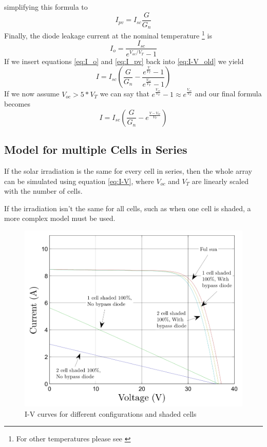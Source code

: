 simplifying this formula to
\begin{equation} \label{eq:I_pv}
    I_{pv} = I_{sc} \frac{G}{G_n}
\end{equation}
Finally, the  diode  leakage  current  at  the nominal temperature \footnote{For
other temperatures please see \cite{ref:villa:pvmodel}} is
\begin{equation} \label{eq:I_o}
    I_o = \frac{I_{sc}}{e^{V_{oc} / V_T} - 1}
\end{equation}
If  we   insert   equations   \eqref{eq:I_o}   and   \eqref{eq:I_pv}  back  into
\eqref{eq:I-V_old} we yield
\begin{equation}
    I = I_{sc} \left( \frac{G}{G_n} - \frac{e^{\frac{V}{V_T}}-1}{e^{\frac{V_{oc}}{V_T}}-1} \right)
\end{equation}
If we now assume $V_{oc} > 5 * V_T$ we can  say  that  $e^{\frac{V_{oc}}{V_T}}-1
\approx e^{\frac{V_{oc}}{V_T}}$ and our final formula becomes
\begin{equation} \label{eq:I-V}
    I = I_{sc} \left( \frac{G}{G_n} - e^{\frac{V - V_{oc}}{V_T}} \right)
\end{equation}


\subsection{Model for multiple Cells in Series}

If the solar irradiation is the same  for  every  cell in series, then the whole
array  can be simulated using equation \eqref{eq:I-V}, where $V_{oc}$  and  $V_T$
are linearly scaled with the number of cells.

If the irradiation isn't the same for all  cells,  such  as  when  one  cell  is
shaded, a more complex model must be used.
\begin{figure}[h]
	\center
    \includegraphics[width=.5\textwidth]{images/model/shaded.png}
    \caption{I-V curves for different configurations and shaded cells\cite{ref:tian:model}}
    \label{fig:model:shaded}
\end{figure}

